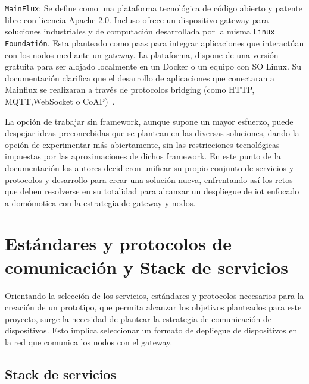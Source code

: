 \vspace{1cm}

\verb|MainFlux|: Se define como una plataforma tecnológica de código abierto y patente libre con licencia Apache 2.0. Incluso ofrece un dispositivo \gls{gateway} para soluciones industriales y de computación desarrollada por la misma \verb|Linux Foundatión|. Esta planteado como \gls{paas} para integrar aplicaciones que interactúan con los nodos mediante un \gls{gateway}. La plataforma, dispone de una versión gratuita para ser alojado localmente en un Docker o un equipo con SO Linux. Su documentación clarifica que el desarrollo de aplicaciones que conectaran a Mainflux se realizaran a través de protocolos bridging (como HTTP, MQTT,WebSocket o CoAP)~\cite{mainfluxdoc}.


La opción de trabajar sin \gls{framework}, aunque supone un mayor esfuerzo, puede despejar ideas preconcebidas que se plantean en las diversas soluciones, dando la opción de experimentar más abiertamente, sin las restricciones tecnológicas impuestas por las aproximaciones de dichos \gls{framework}. En este punto de la documentación los autores decidieron unificar su propio conjunto de servicios y protocolos y desarrollo para crear una solución nueva, enfrentando así los retos que deben resolverse en su totalidad para alcanzar un despliegue de \gls{iot} enfocado a domómotica con la estrategia de \gls{gateway} y nodos.

\section{Estándares y protocolos de comunicación y Stack de servicios}
\label{ch:Capitulo2.3}

Orientando la selección de los servicios, estándares y protocolos necesarios para la creación de un prototipo, que permita alcanzar los objetivos planteados para este proyecto, surge la necesidad de plantear la estrategia de comunicación de dispositivos. Esto implica seleccionar un formato de depliegue de dispositivos en la red que comunica los nodos con el \gls{gateway}. 

\vspace{1cm}

\subsection{Stack de servicios}
\label{ch:Capitulo2.3.1}


